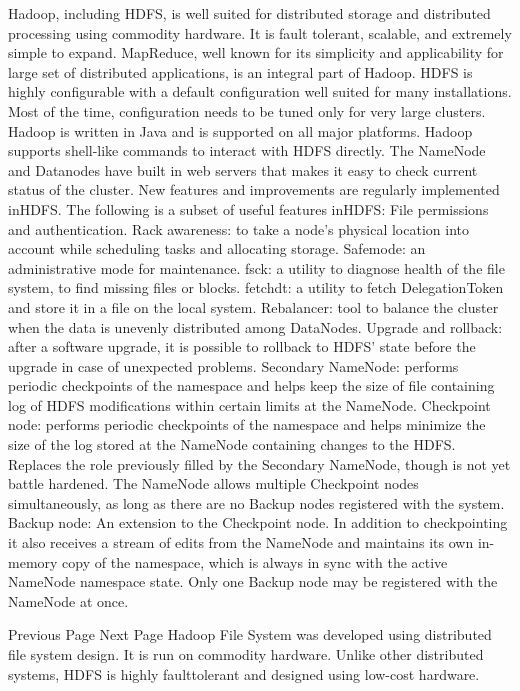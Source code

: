 Hadoop, including HDFS, is well suited for distributed storage and distributed processing using commodity hardware. It is fault tolerant, scalable, and extremely simple to expand. MapReduce, well known for its simplicity and applicability for large set of distributed applications, is an integral part of Hadoop.
HDFS is highly configurable with a default configuration well suited for many installations. Most of the time, configuration needs to be tuned only for very large clusters.
Hadoop is written in Java and is supported on all major platforms.
Hadoop supports shell-like commands to interact with HDFS directly.
The NameNode and Datanodes have built in web servers that makes it easy to check current status of the cluster.
New features and improvements are regularly implemented inHDFS. The following is a subset of useful features inHDFS:
File permissions and authentication.
Rack awareness: to take a node’s physical location into account while scheduling tasks and allocating storage.
Safemode: an administrative mode for maintenance.
fsck: a utility to diagnose health of the file system, to find missing files or blocks.
fetchdt: a utility to fetch DelegationToken and store it in a file on the local system.
Rebalancer: tool to balance the cluster when the data is unevenly distributed among DataNodes.
Upgrade and rollback: after a software upgrade, it is possible to rollback to HDFS’ state before the upgrade in case of unexpected problems.
Secondary NameNode: performs periodic checkpoints of the namespace and helps keep the size of file containing log of HDFS modifications within certain limits at the NameNode.
Checkpoint node: performs periodic checkpoints of the namespace and helps minimize the size of the log stored at the NameNode containing changes to the HDFS. Replaces the role previously filled by the Secondary NameNode, though is not yet battle hardened. The NameNode allows multiple Checkpoint nodes simultaneously, as long as there are no Backup nodes registered with the system.
Backup node: An extension to the Checkpoint node. In addition to checkpointing it also receives a stream of edits from the NameNode and maintains its own in-memory copy of the namespace, which is always in sync with the active NameNode namespace state. Only one Backup node may be registered with the NameNode at once.



 Previous Page Next Page  
Hadoop File System was developed using distributed file system design. It is run on commodity hardware. Unlike other distributed systems, HDFS is highly faulttolerant and designed using low-cost hardware.


